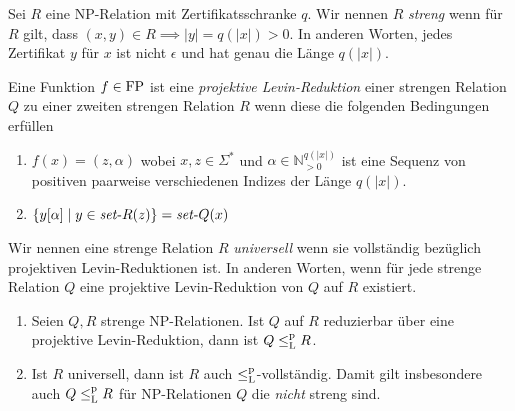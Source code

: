 \begin{definition}
    Sei $R$ eine NP-Relation mit Zertifikatsschranke $q$. 
    Wir nennen $R$ \emph{streng} wenn für $R$ gilt, dass $(x,y)\in R\implies |y|=q(|x|)>0$. In anderen Worten, jedes Zertifikat $y$ für $x$ ist nicht $\epsilon$ und hat genau die Länge $q(|x|)$.

    Eine Funktion $f\in \mathrm{FP}$ ist eine \emph{projektive Levin-Reduktion} einer strengen Relation $Q$ zu einer zweiten strengen Relation $R$ wenn diese die folgenden Bedingungen erfüllen
    \begin{enumerate}
        \item $f(x)=(z,\alpha)$ wobei $x,z\in\Sigma^*$ und $\alpha\in\mathbb N_{>0}^{q(|x|)}$ ist eine Sequenz von positiven paarweise verschiedenen  Indizes der Länge $q(|x|)$.
        \item $\{ y[\alpha] \mid y\in \mathit{set}\text{-}{}R(z) \} = \mathit{set}\text{-}{}Q(x)$
    \end{enumerate}

    Wir nennen eine strenge Relation $R$ \emph{universell} wenn sie vollständig bezüglich projektiven Levin-Reduktionen ist. In anderen Worten, wenn für jede strenge Relation $Q$ eine projektive Levin-Reduktion von $Q$ auf $R$ existiert.
\end{definition}
\begin{lemma}
    \begin{enumerate}
        \item Seien $Q, R$ strenge NP-Relationen. Ist $Q$ auf $R$ reduzierbar über eine projektive Levin-Reduktion, dann ist $Q\leq_\mathrm{L}^\mathrm{p} R$.
        \item Ist $R$ universell, dann ist $R$ auch $\leq_\mathrm{L}^\mathrm{p}$-vollständig. Damit gilt insbesondere auch $Q\leq_\mathrm{L}^\mathrm{p} R$ für NP-Relationen $Q$ die \emph{nicht} streng sind.
    \end{enumerate}
\end{lemma}

